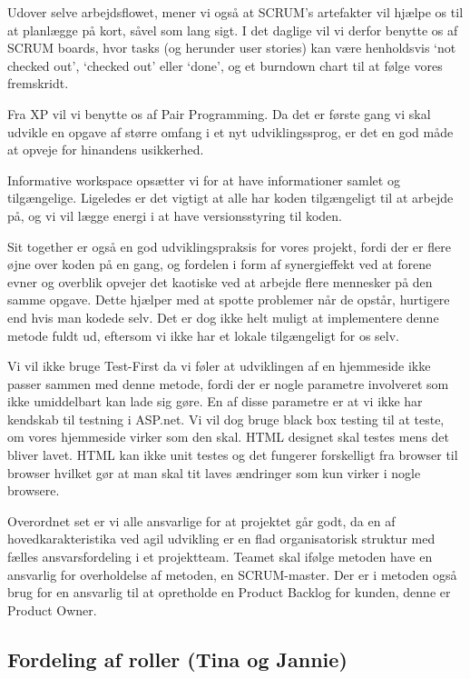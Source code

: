 \documentclass[12pt, a4paper]{report}
\begin{document}
Udover selve arbejdsflowet, mener vi også at SCRUM’s artefakter vil hjælpe os til at planlægge på kort, såvel som lang sigt. I det daglige vil vi derfor benytte os af SCRUM boards, hvor tasks (og herunder user stories) kan være henholdsvis ‘not checked out’, ‘checked out’ eller ‘done’, og et burndown chart til at følge vores fremskridt.

Fra XP vil vi benytte os af Pair Programming. Da det er første gang vi skal udvikle en opgave af større omfang i et nyt udviklingssprog, er det en god måde at opveje for hinandens usikkerhed.

Informative workspace opsætter vi for at have informationer samlet og tilgængelige. Ligeledes er det vigtigt at alle har koden tilgængeligt til at arbejde på, og vi vil lægge energi i at have versionsstyring til koden.

Sit together er også en god udviklingspraksis for vores projekt, fordi der er flere øjne over koden på en gang, og fordelen i form af synergieffekt ved at forene evner og overblik opvejer det kaotiske ved at arbejde flere mennesker på den samme opgave. Dette hjælper med at spotte problemer når de opstår, hurtigere end hvis man kodede selv. Det er dog ikke helt muligt at implementere denne metode fuldt ud, eftersom vi ikke har et lokale tilgængeligt for os selv.

Vi vil ikke bruge Test-First da vi føler at udviklingen af en hjemmeside ikke passer sammen med denne metode, fordi der er nogle parametre involveret som ikke umiddelbart kan lade sig gøre. En af disse parametre er at vi ikke har kendskab til testning i ASP.net.
Vi vil dog bruge black box testing til at teste, om vores hjemmeside virker som den skal.
HTML designet skal testes mens det bliver lavet. HTML kan ikke unit testes og det fungerer forskelligt fra browser til browser hvilket gør at man skal tit laves ændringer som kun virker i nogle browsere.


Overordnet set er vi alle ansvarlige for at projektet går godt, da en af hovedkarakteristika ved agil udvikling er en flad organisatorisk struktur med fælles ansvarsfordeling i et projektteam. Teamet skal ifølge metoden have en ansvarlig for overholdelse af metoden, en SCRUM-master. Der er i metoden også brug for en ansvarlig til at opretholde en Product Backlog for kunden, denne er Product Owner.

\subsection{Fordeling af roller (Tina og Jannie)}
\end{document}
